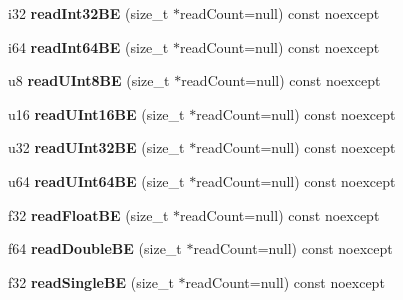 \begin{DoxyCompactItemize}
\item 
\mbox{\label{class_binary_reader_a216b12473bc04f43812add4b742cd23b}} 
i32 {\bfseries read\+Int32\+BE} (size\+\_\+t $\ast$read\+Count=null) const noexcept
\item 
\mbox{\label{class_binary_reader_a5f31520f769ae65b3a9c826b39c16801}} 
i64 {\bfseries read\+Int64\+BE} (size\+\_\+t $\ast$read\+Count=null) const noexcept
\item 
\mbox{\label{class_binary_reader_add248d83d251ef500460dfa3f4ba06cd}} 
u8 {\bfseries read\+U\+Int8\+BE} (size\+\_\+t $\ast$read\+Count=null) const noexcept
\item 
\mbox{\label{class_binary_reader_af17400566145980d56efea21fc24d8f0}} 
u16 {\bfseries read\+U\+Int16\+BE} (size\+\_\+t $\ast$read\+Count=null) const noexcept
\item 
\mbox{\label{class_binary_reader_ad9b43cc62cb4ea62af5b3f0c69331e6d}} 
u32 {\bfseries read\+U\+Int32\+BE} (size\+\_\+t $\ast$read\+Count=null) const noexcept
\item 
\mbox{\label{class_binary_reader_a54904a89711fc90b3751b73ab6c7aa44}} 
u64 {\bfseries read\+U\+Int64\+BE} (size\+\_\+t $\ast$read\+Count=null) const noexcept
\item 
\mbox{\label{class_binary_reader_a35a33aa1fd938b6b7ceeabed96ed7b69}} 
f32 {\bfseries read\+Float\+BE} (size\+\_\+t $\ast$read\+Count=null) const noexcept
\item 
\mbox{\label{class_binary_reader_a502d2cfe0f07412bbb0a88823a96450d}} 
f64 {\bfseries read\+Double\+BE} (size\+\_\+t $\ast$read\+Count=null) const noexcept
\item 
\mbox{\label{class_binary_reader_a5c342f3d88f93c220974073b1d08d86b}} 
f32 {\bfseries read\+Single\+BE} (size\+\_\+t $\ast$read\+Count=null) const noexcept
\item 
\mbox{\label{class_binary_reader_a1adae9906731a3cea96b81204a364af1}} 

\end{DoxyCompactItemize}
